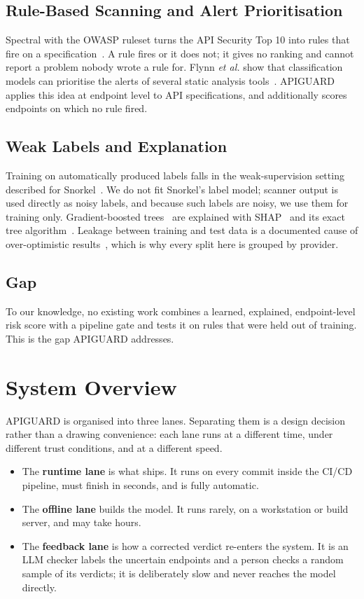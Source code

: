 \documentclass[conference]{IEEEtran}
\begin{document}
\subsection{Rule-Based Scanning and Alert Prioritisation}
Spectral with the OWASP ruleset turns the API Security Top 10 into rules that fire on a
specification~\cite{spectralowasp,owasptop10}. A rule fires or it does not; it gives no ranking
and cannot report a problem nobody wrote a rule for. Flynn \emph{et al.} show that
classification models can prioritise the alerts of several static analysis tools~\cite{flynn}.
APIGUARD applies this idea at endpoint level to API specifications, and additionally scores
endpoints on which no rule fired.

\subsection{Weak Labels and Explanation}
Training on automatically produced labels falls in the weak-supervision setting described
for Snorkel~\cite{snorkel}. We do not fit Snorkel's label model; scanner output is used
directly as noisy labels, and because such labels are noisy, we use them for training only.
Gradient-boosted trees~\cite{xgboost} are explained with SHAP~\cite{shap} and its exact
tree algorithm~\cite{treeshap}. Leakage between training and test data is a documented cause of
over-optimistic results~\cite{kapoor}, which is why every split here is grouped by provider.

\subsection{Gap}
To our knowledge, no existing work combines a learned, explained, endpoint-level risk score
with a pipeline gate and tests it on rules that were held out of training. This is the gap
APIGUARD addresses.

\section{System Overview}
APIGUARD is organised into three lanes. Separating them is a design decision rather than a
drawing convenience: each lane runs at a different time, under different trust conditions,
and at a different speed.

\begin{itemize}
\item The \textbf{runtime lane} is what ships. It runs on every commit inside the CI/CD
pipeline, must finish in seconds, and is fully automatic.
\item The \textbf{offline lane} builds the model. It runs rarely, on a workstation or build
server, and may take hours.
\item The \textbf{feedback lane} is how a corrected verdict re-enters the system. It is
an LLM checker labels the uncertain endpoints and a person checks a random sample of its verdicts; it is deliberately slow and never reaches the model directly.
\end{itemize}
\end{document}
